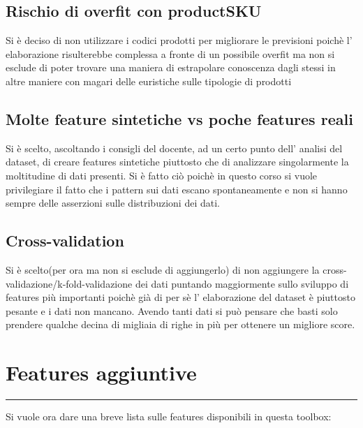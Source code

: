 \documentclass[11pt]{article}
\begin{document}
\subsection{Rischio di overfit con
productSKU}\label{rischio-di-overfit-con-productsku}

Si è deciso di non utilizzare i codici prodotti per migliorare le
previsioni poichè l' elaborazione risulterebbe complessa a fronte di un
possibile overfit ma non si esclude di poter trovare una maniera di
estrapolare conoscenza dagli stessi in altre maniere con magari delle
euristiche sulle tipologie di prodotti

\subsection{Molte feature sintetiche vs poche features
reali}\label{molte-feature-sintetiche-vs-poche-features-reali}

Si è scelto, ascoltando i consigli del docente, ad un certo punto dell'
analisi del dataset, di creare features sintetiche piuttosto che di
analizzare singolarmente la moltitudine di dati presenti. Si è fatto ciò
poichè in questo corso si vuole privilegiare il fatto che i pattern sui
dati escano spontaneamente e non si hanno sempre delle asserzioni sulle
distribuzioni dei dati.

\subsection{Cross-validation}\label{cross-validation}

Si è scelto(per ora ma non si esclude di aggiungerlo) di non aggiungere
la cross-validazione/k-fold-validazione dei dati puntando maggiormente
sullo sviluppo di features più importanti poichè già di per sè l'
elaborazione del dataset è piuttosto pesante e i dati non mancano.
Avendo tanti dati si può pensare che basti solo prendere qualche decina
di migliaia di righe in più per ottenere un migliore score.

    \section{Features aggiuntive}\label{features-aggiuntive}

\begin{center}\rule{0.5\linewidth}{\linethickness}\end{center}

Si vuole ora dare una breve lista sulle features disponibili in questa
toolbox:
\end{document}
